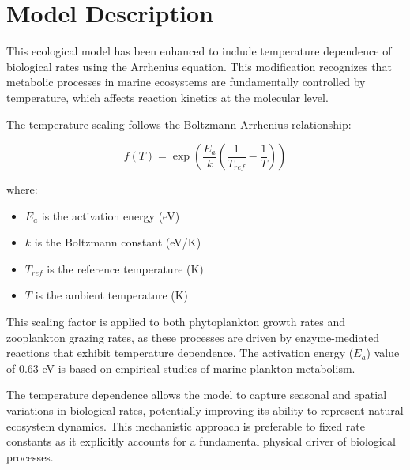 \section{Model Description}

This ecological model has been enhanced to include temperature dependence of biological rates using the Arrhenius equation. This modification recognizes that metabolic processes in marine ecosystems are fundamentally controlled by temperature, which affects reaction kinetics at the molecular level.

The temperature scaling follows the Boltzmann-Arrhenius relationship:

\[ f(T) = \exp\left(\frac{E_a}{k}\left(\frac{1}{T_{ref}} - \frac{1}{T}\right)\right) \]

where:
\begin{itemize}
\item $E_a$ is the activation energy (eV)
\item $k$ is the Boltzmann constant (eV/K)
\item $T_{ref}$ is the reference temperature (K)
\item $T$ is the ambient temperature (K)
\end{itemize}

This scaling factor is applied to both phytoplankton growth rates and zooplankton grazing rates, as these processes are driven by enzyme-mediated reactions that exhibit temperature dependence. The activation energy ($E_a$) value of 0.63 eV is based on empirical studies of marine plankton metabolism.

The temperature dependence allows the model to capture seasonal and spatial variations in biological rates, potentially improving its ability to represent natural ecosystem dynamics. This mechanistic approach is preferable to fixed rate constants as it explicitly accounts for a fundamental physical driver of biological processes.
